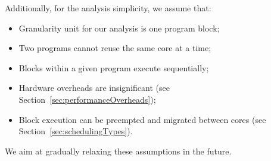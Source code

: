 Additionally, for the analysis simplicity, we assume that:
%
\begin{itemize}
\item Granularity unit for our analysis is one program block;
\item Two programs cannot reuse the same core at a time;
\item Blocks within a given program execute sequentially;
\item Hardware overheads are insignificant (see Section~\ref{sec:performanceOverheads});
\item Block execution can be preempted and migrated between cores (see Section~\ref{sec:schedulingTypes}).
\end{itemize}
%
We aim at gradually relaxing these assumptions in the future.


